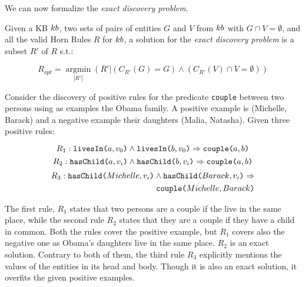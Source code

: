 We can now formalize the \emph{exact discovery problem}.\newline
\begin{definition}
	Given a KB ${\sc kb}$, two sets of pairs of entities $G$ and $V$ from ${\sc kb}$ with $G \cap V = \emptyset$, and all the valid Horn Rules $R$ for ${\sc kb}$, a solution for the \emph{exact discovery problem} is a subset $R'$ of $R$  s.t.:
	
	\vspace{-6mm}	
	\begin{equation*}
		R_{opt}=\underset{|R'|}{\operatorname{argmin}}(R'|(C_{R'}(G) = G) \wedge (C_{R'}(V) \cap V = \emptyset) )	\end{equation*}
	\end{definition}
	\vspace{-1ex}	

\begin{example}
	Consider the discovery of positive rules for the predicate {\tt couple} between two persons using as examples the Obama family. A positive example is (Michelle, Barack) and a negative example their daughters (Malia, Natasha). 
	Given three positive rules:
	
	\vspace{-4ex}	
	{\small	
		\begin{equation*}
		R_{1}:	\texttt{livesIn(}a,v_0\texttt{)} \wedge \texttt{livesIn(}b,v_0\texttt{)} \Rightarrow  \texttt{couple(}a,b\texttt{)}  
		\end{equation*}
			\vspace{-3ex}	
		\begin{equation*}
		R_{2}:	\texttt{hasChild(}a,v_i\texttt{)} \wedge \texttt{hasChild(}b,v_i\texttt{)} \Rightarrow  \texttt{couple(}a,b\texttt{)}  
		\end{equation*}
		\vspace{-3ex}	
		\begin{equation*}
			\begin{split}
			R_{3}:	\texttt{hasChild(}Michelle,v_i\texttt{)} \wedge  \texttt{hasChild(}Barack,v_i\texttt{)} \Rightarrow \\ \texttt{couple(}Michelle,Barack\texttt{)}
			\end{split}
		\end{equation*}
	}
	\vspace{-3ex}	
	
	\noindent
	The first rule, $R_{1}$ states that two persons are a couple if the live in the same place, while the second rule $R_{2}$ states that they are a couple if they have a child in common. Both the rules cover the positive example, but $R_{1}$ covers also the negative one as Obama's daughters live in the same place. $R_{2}$ is an exact solution. Contrary to both of them, the third rule $R_{3}$ explicitly mentions the values of the entities in its head and body. Though it is also an exact solution, it overfits the given positive examples. %
\end{example} 

